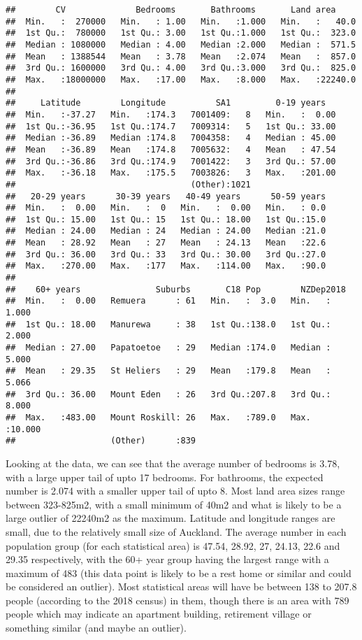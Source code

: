 \documentclass[
]{article}
\begin{document}
\begin{verbatim}
##        CV              Bedrooms       Bathrooms       Land area      
##  Min.   :  270000   Min.   : 1.00   Min.   :1.000   Min.   :   40.0  
##  1st Qu.:  780000   1st Qu.: 3.00   1st Qu.:1.000   1st Qu.:  323.0  
##  Median : 1080000   Median : 4.00   Median :2.000   Median :  571.5  
##  Mean   : 1388544   Mean   : 3.78   Mean   :2.074   Mean   :  857.0  
##  3rd Qu.: 1600000   3rd Qu.: 4.00   3rd Qu.:3.000   3rd Qu.:  825.0  
##  Max.   :18000000   Max.   :17.00   Max.   :8.000   Max.   :22240.0  
##                                                                      
##     Latitude        Longitude          SA1         0-19 years    
##  Min.   :-37.27   Min.   :174.3   7001409:   8   Min.   :  0.00  
##  1st Qu.:-36.95   1st Qu.:174.7   7009314:   5   1st Qu.: 33.00  
##  Median :-36.89   Median :174.8   7004358:   4   Median : 45.00  
##  Mean   :-36.89   Mean   :174.8   7005632:   4   Mean   : 47.54  
##  3rd Qu.:-36.86   3rd Qu.:174.9   7001422:   3   3rd Qu.: 57.00  
##  Max.   :-36.18   Max.   :175.5   7003826:   3   Max.   :201.00  
##                                   (Other):1021                   
##   20-29 years      30-39 years   40-49 years      50-59 years  
##  Min.   :  0.00   Min.   :  0   Min.   :  0.00   Min.   : 0.0  
##  1st Qu.: 15.00   1st Qu.: 15   1st Qu.: 18.00   1st Qu.:15.0  
##  Median : 24.00   Median : 24   Median : 24.00   Median :21.0  
##  Mean   : 28.92   Mean   : 27   Mean   : 24.13   Mean   :22.6  
##  3rd Qu.: 36.00   3rd Qu.: 33   3rd Qu.: 30.00   3rd Qu.:27.0  
##  Max.   :270.00   Max.   :177   Max.   :114.00   Max.   :90.0  
##                                                                
##    60+ years               Suburbs       C18 Pop        NZDep2018     
##  Min.   :  0.00   Remuera      : 61   Min.   :  3.0   Min.   : 1.000  
##  1st Qu.: 18.00   Manurewa     : 38   1st Qu.:138.0   1st Qu.: 2.000  
##  Median : 27.00   Papatoetoe   : 29   Median :174.0   Median : 5.000  
##  Mean   : 29.35   St Heliers   : 29   Mean   :179.8   Mean   : 5.066  
##  3rd Qu.: 36.00   Mount Eden   : 26   3rd Qu.:207.8   3rd Qu.: 8.000  
##  Max.   :483.00   Mount Roskill: 26   Max.   :789.0   Max.   :10.000  
##                   (Other)      :839
\end{verbatim}

Looking at the data, we can see that the average number of bedrooms is
3.78, with a large upper tail of upto 17 bedrooms. For bathrooms, the
expected number is 2.074 with a smaller upper tail of upto 8. Most land
area sizes range between 323-825m2, with a small minimum of 40m2 and
what is likely to be a large outlier of 22240m2 as the maximum. Latitude
and longitude ranges are small, due to the relatively small size of
Auckland. The average number in each population group (for each
statistical area) is 47.54, 28.92, 27, 24.13, 22.6 and 29.35
respectively, with the 60+ year group having the largest range with a
maximum of 483 (this data point is likely to be a rest home or similar
and could be considered an outlier). Most statistical areas will have be
between 138 to 207.8 people (according to the 2018 census) in them,
though there is an area with 789 people which may indicate an apartment
building, retirement village or something similar (and maybe an
outlier).
\end{document}
